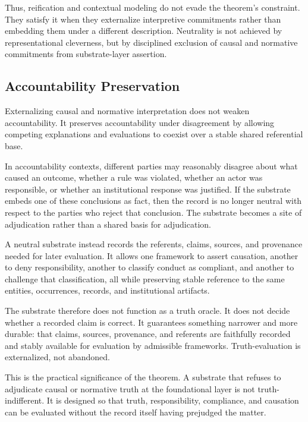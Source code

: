 Thus, reification and contextual modeling do not evade
the theorem's constraint.
They satisfy it when they externalize interpretive commitments
rather than embedding them under a different description.
Neutrality is not achieved by representational cleverness,
but by disciplined exclusion of causal and normative commitments from
substrate-layer assertion.

\subsection{Accountability Preservation}
\label{subsec:accountability}

Externalizing causal and normative interpretation
does not weaken accountability.
It preserves accountability under disagreement
by allowing competing explanations and evaluations
to coexist over a stable shared referential base.

In accountability contexts,
different parties may reasonably disagree
about what caused an outcome,
whether a rule was violated,
whether an actor was responsible,
or whether an institutional response was justified.
If the substrate embeds one of these conclusions as fact,
then the record is no longer neutral with respect to the parties
who reject that conclusion.
The substrate becomes a site of adjudication
rather than a shared basis for adjudication.

A neutral substrate instead records
the referents, claims, sources, and provenance
needed for later evaluation.
It allows one framework to assert causation,
another to deny responsibility,
another to classify conduct as compliant,
and another to challenge that classification,
all while preserving stable reference
to the same entities, occurrences, records, and institutional artifacts.

The substrate therefore does not function as a truth oracle.
It does not decide whether a recorded claim is correct.
It guarantees something narrower and more durable:
that claims, sources, provenance, and referents
are faithfully recorded and stably available
for evaluation by admissible frameworks.
Truth-evaluation is externalized,
not abandoned.

This is the practical significance of the theorem.
A substrate that refuses to adjudicate causal or normative truth
at the foundational layer is not truth-indifferent.
It is designed so that truth, responsibility,
compliance, and causation can be evaluated
without the record itself having prejudged the matter.

